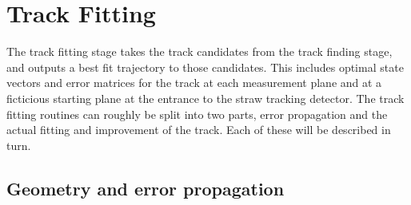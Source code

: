 






\section{Track Fitting}
\label{sec:TrackFitting}




The track fitting stage takes the track candidates from the track finding stage, and outputs a best fit trajectory to those candidates. This includes optimal state vectors and error matrices for the track at each measurement plane and at a ficticious starting plane at the entrance to the straw tracking detector. The track fitting routines can roughly be split into two parts, error propagation and the actual fitting and improvement of the track. Each of these will be described in turn.


\subsection{Geometry and error propagation}

